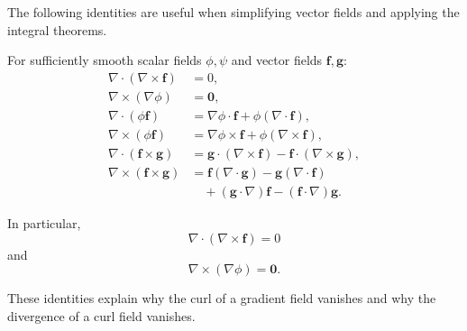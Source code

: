 \begin{method}
The following identities are useful when simplifying vector fields and applying the integral theorems.

For sufficiently smooth scalar fields \(\phi,\psi\) and vector fields \(\boldsymbol f,\boldsymbol g\):
\[
\begin{aligned}
\nabla\cdot(\nabla\times\boldsymbol f)
&=0,\\
\nabla\times(\nabla\phi)
&=\boldsymbol 0,\\
\nabla\cdot(\phi\boldsymbol f)
&=\nabla\phi\cdot\boldsymbol f
+\phi(\nabla\cdot\boldsymbol f),\\
\nabla\times(\phi\boldsymbol f)
&=\nabla\phi\times\boldsymbol f
+\phi(\nabla\times\boldsymbol f),\\
\nabla\cdot(\boldsymbol f\times\boldsymbol g)
&=\boldsymbol g\cdot(\nabla\times\boldsymbol f)
-\boldsymbol f\cdot(\nabla\times\boldsymbol g),\\
\nabla\times(\boldsymbol f\times\boldsymbol g)
&=
\boldsymbol f(\nabla\cdot\boldsymbol g)
-\boldsymbol g(\nabla\cdot\boldsymbol f)\\
&\quad+
(\boldsymbol g\cdot\nabla)\boldsymbol f
-(\boldsymbol f\cdot\nabla)\boldsymbol g.
\end{aligned}
\]

In particular,
\[
\boxed{
\nabla\cdot(\nabla\times\boldsymbol f)=0
}
\]
and
\[
\boxed{
\nabla\times(\nabla\phi)=\boldsymbol 0.
}
\]

These identities explain why the curl of a gradient field vanishes and why the divergence of a curl field vanishes.
\end{method}

